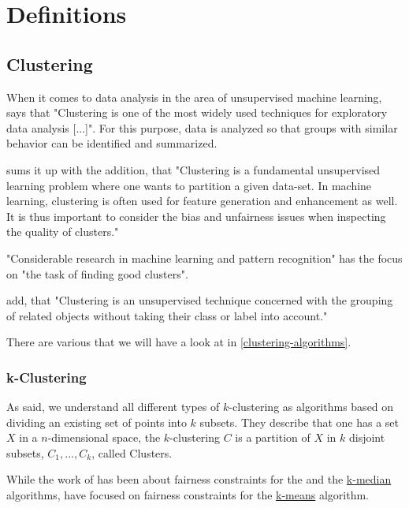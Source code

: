 \section{Definitions}


\subsection{Clustering}

When it comes to data analysis in the area of unsupervised machine learning, \textcite[1]{VonLuxburg2007} says that "Clustering is one of the most widely used techniques for exploratory data analysis [...]". For this purpose, data is analyzed so that groups with similar behavior can be identified and summarized.

\textcite[1]{Bera2019} sums it up with the addition, that "Clustering is a fundamental unsupervised learning problem where one wants to partition a given data-set. In machine learning, clustering is often used for feature generation and enhancement as well. It is thus important to consider the bias and unfairness issues when inspecting the quality of clusters."

"Considerable research in machine learning and pattern recognition" has the focus on "the task of finding good clusters". \autocite[1]{Ng2001}

\textcite[1]{Nascimento2011} add, that "Clustering is an unsupervised technique concerned with the grouping of related objects without taking their class or label into account."

There are various  that we will have a look at in \autoref{clustering-algorithms}.

\subsubsection{k-Clustering}

As  \textcite[]{Chierichetti2018} said, we understand all different types of $k$-clustering as algorithms based on dividing an existing set of points into $k$ subsets. They describe that one has a set $X$ in a $n$-dimensional space, the $k$-clustering $C$ is a partition of $X$ in $k$ disjoint subsets, $C_{1},...,C_{k}$, called Clusters. \autocite[3]{Chierichetti2018}

While the work of \textcite[]{Chierichetti2018} has been about fairness constraints for the  and the \hyperref[k-median]{k-median} algorithms, \textcite[]{Schmidt2018} have focused on fairness constraints for the \hyperref[k-means]{k-means} algorithm.


